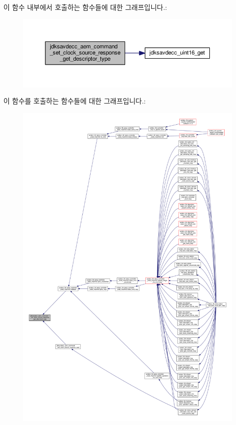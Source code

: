 이 함수 내부에서 호출하는 함수들에 대한 그래프입니다.\+:
\nopagebreak
\begin{figure}[H]
\begin{center}
\leavevmode
\includegraphics[width=350pt]{group__command__set__clock__source__response_gaf651f455e5ae050ebb45c8b629216ad2_cgraph}
\end{center}
\end{figure}




이 함수를 호출하는 함수들에 대한 그래프입니다.\+:
\nopagebreak
\begin{figure}[H]
\begin{center}
\leavevmode
\includegraphics[width=350pt]{group__command__set__clock__source__response_gaf651f455e5ae050ebb45c8b629216ad2_icgraph}
\end{center}
\end{figure}


